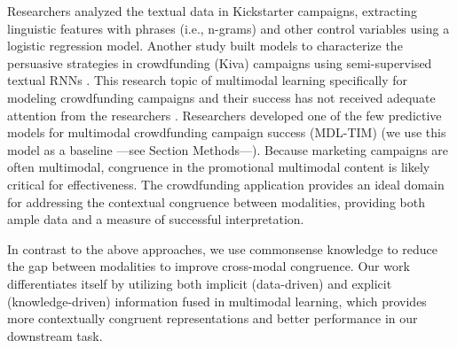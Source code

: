 Researchers \cite{Mitra2014-ly} analyzed the textual data in Kickstarter campaigns, extracting linguistic features with phrases (i.e., n-grams) and other control variables using a logistic regression model. 
Another study built models to characterize the persuasive strategies in crowdfunding (Kiva) campaigns using semi-supervised textual RNNs \cite{yang2019let}. This research topic of multimodal learning
specifically for modeling crowdfunding campaigns and their success has not received adequate attention from the researchers \cite{Palmieri2022-ch,Carradini2023-ka}. Researchers \cite{cheng2019success} developed one of the few predictive models for multimodal crowdfunding campaign success (MDL-TIM) (we use this model as a baseline ---see Section Methods---). 
Because marketing campaigns are often multimodal, congruence in the promotional multimodal content is likely critical for effectiveness. The crowdfunding application provides an ideal domain for addressing the contextual congruence between modalities, providing both ample data and a measure of successful interpretation.

In contrast to the above approaches, we use commonsense knowledge to reduce the gap between modalities to 
improve cross-modal congruence. Our work differentiates itself by utilizing both implicit (data-driven) and explicit (knowledge-driven) information fused in multimodal learning, which provides more contextually congruent representations and better performance in our downstream task.


